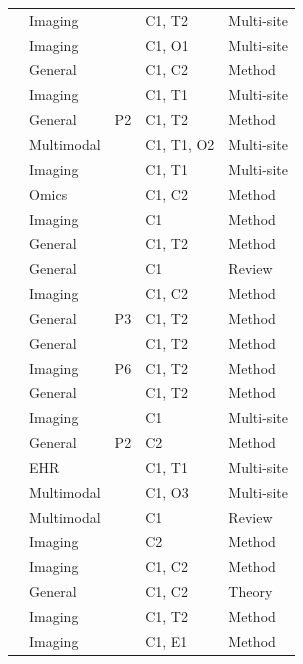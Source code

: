{\begin{longtable}{@{}p{5.6cm}llll@{}}
\citet{roth2020federated} & Imaging &  & C1, T2 & Multi-site\\
\citet{sheller2020federated} & Imaging &  & C1, O1 & Multi-site\\
\citet{wei2020federated} & General &  & C1, C2 & Method\\
\citet{bai2021advancing} & Imaging &  & C1, T1 & Multi-site\\
\citet{collins2021exploiting} & General & P2 & C1, T2 & Method\\
\citet{dayan2021federated} & Multimodal &  & C1, T1, O2 & Multi-site\\
\citet{dou2021federated} & Imaging &  & C1, T1 & Multi-site\\
\citet{froelicher2021truly} & Omics &  & C1, C2 & Method\\
\citet{guo2021multi} & Imaging &  & C1 & Method\\
\citet{huang2021personalized} & General &  & C1, T2 & Method\\
\citet{kairouz2021advances} & General &  & C1 & Review\\
\citet{kaissis2021end} & Imaging &  & C1, C2 & Method\\
\citet{li2021ditto} & General & P3 & C1, T2 & Method\\
\citet{li2021fedbn} & General &  & C1, T2 & Method\\
\citet{liu2021feddg} & Imaging & P6 & C1, T2 & Method\\
\citet{marfoq2021federated} & General &  & C1, T2 & Method\\
\citet{sarma2021federated} & Imaging &  & C1 & Multi-site\\
\citet{tramer2021differentially} & General & P2 & C2 & Method\\
\citet{vaid2021federated} & EHR &  & C1, T1 & Multi-site\\
\citet{warnatherresthal2021swarm} & Multimodal &  & C1, O3 & Multi-site\\
\citet{xu2021federated} & Multimodal &  & C1 & Review\\
\citet{ziller2021medical} & Imaging &  & C2 & Method\\
\citet{adnan2022federated} & Imaging &  & C1, C2 & Method\\
\citet{cyffers2022privacy} & General &  & C1, C2 & Theory\\
\citet{jiang2022harmofl} & Imaging &  & C1, T2 & Method\\
\citet{lu2022federated} & Imaging &  & C1, E1 & Method\\

\end{longtable}}

